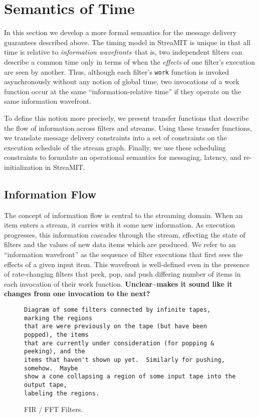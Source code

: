 \section{Semantics of Time}

In this section we develop a more formal semantics for the message
delivery guarantees described above.  The timing model in StreaMIT is
unique in that all time is relative to {\it information
wavefronts}--that is, two independent filters can describe a common time
only in terms of when the {\it effects} of one filter's execution are
seen by another.  Thus, although each filter's {\tt work} function is
invoked asynchronously without any notion of global time, two
invocations of a work function occur at the same ``information-relative
time'' if they operate on the same information wavefront.

To define this notion more precisely, we present transfer functions that
describe the flow of information across filters and streams.  Using
these transfer functions, we translate message delivery constraints into
a set of constraints on the execution schedule of the stream graph.
Finally, we use these scheduling constraints to formulate an operational
semantics for messaging, latency, and re-initialization in StreaMIT.

\subsection{Information Flow}

The concept of information flow is central to the streaming domain.
When an item enters a stream, it carries with it some new information.
As execution progresses, this information cascades through the stream,
effecting the state of filters and the values of new data items which
are produced.  We refer to an ``information wavefront'' as the
sequence of filter executions that first sees the effects of a given
input item.  This wavefront is well-defined even in the presence of
rate-changing filters that peek, pop, and push differing number of
items in each invocation of their work function. {\bf Unclear--makes
it sound like it changes from one invocation to the next?}

\begin{figure}[t]
\begin{verbatim}
Diagram of some filters connected by infinite tapes, marking the regions
that are were previously on the tape (but have been popped), the items
that are currently under consideration (for popping & peeking), and the
items that haven't shown up yet.  Similarly for pushing, somehow.  Maybe
show a cone collapsing a region of some input tape into the output tape,
labeling the regions.
\end{verbatim}
\vspace{-12pt}
\caption{\protect\small FIR / FFT Filters.}
\vspace{-12pt}
\end{figure}

